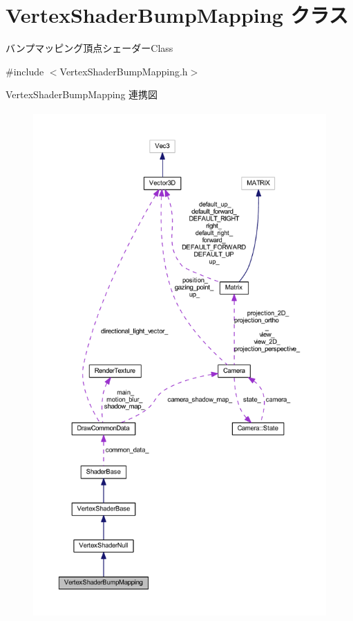 \hypertarget{class_vertex_shader_bump_mapping}{}\section{Vertex\+Shader\+Bump\+Mapping クラス}
\label{class_vertex_shader_bump_mapping}


バンプマッピング頂点シェーダー\+Class  




{\ttfamily \#include $<$Vertex\+Shader\+Bump\+Mapping.\+h$>$}



Vertex\+Shader\+Bump\+Mapping 連携図\nopagebreak
\begin{figure}[H]
\begin{center}
\leavevmode
\includegraphics[height=550pt]{class_vertex_shader_bump_mapping__coll__graph}
\end{center}
\end{figure}
